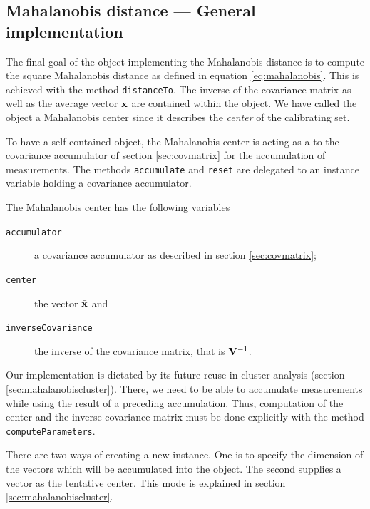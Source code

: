 \documentclass[twoside]{book}
\begin{document}
\subsection{Mahalanobis distance --- General implementation}
 The final goal of the object
implementing the Mahalanobis distance is to compute the square
Mahalanobis distance as defined in equation \ref{eq:mahalanobis}.
This is achieved with the method {\tt distanceTo}. The inverse of
the covariance matrix as well as the average vector $\bar{\bf x}$
are contained within the object. We have called the object a
Mahalanobis center since it describes the {\sl center} of the
calibrating set.

To have a self-contained object, the Mahalanobis center is acting
as a  to the covariance accumulator of section
\ref{sec:covmatrix} for the accumulation of measurements. The
methods {\tt accumulate} and {\tt reset} are delegated to an
instance variable holding a covariance accumulator.

\noindent The Mahalanobis center has the following variables
\begin{description}
  \item[\tt accumulator] a covariance accumulator as described in section
\ref{sec:covmatrix};
  \item[\tt center] the vector $\bar{\bf x}$ and
  \item[\tt inverseCovariance] the inverse of the covariance
  matrix, that is ${\bf V}^{-1}$.
\end{description}
Our implementation is dictated by its future reuse in cluster
analysis (\cf section \ref{sec:mahalanobiscluster}). There, we
need to be able to accumulate measurements while using the result
of a preceding accumulation. Thus, computation of the center and
the inverse covariance matrix must be done explicitly with the
method {\tt computeParameters}.

There are two ways of creating a new instance. One is to specify
the dimension of the vectors which will be accumulated into the
object. The second supplies a vector as the tentative center. This
mode is explained in section \ref{sec:mahalanobiscluster}.
\end{document}
